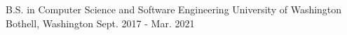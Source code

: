 

\begin{cventries}

  \cventry
  {B.S. in Computer Science and Software Engineering} %
  {University of Washington} %
  {Bothell, Washington} %
  {Sept. 2017 - Mar. 2021} %
  {
    \begin{cvitems} %
      \item {}
    \end{cvitems}
  }

\end{cventries}
